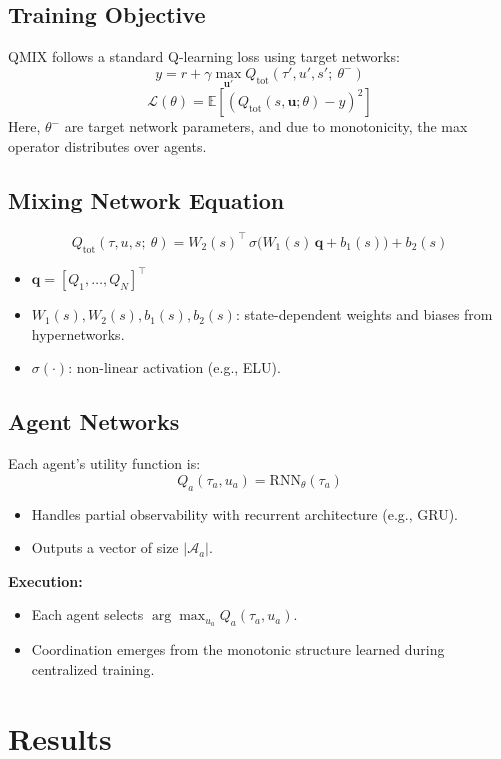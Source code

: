 \documentclass[../Main.tex]{subfiles}
\begin{document}
\subsection{Training Objective}

QMIX follows a standard Q-learning loss using target networks:
\[
y = r + \gamma \max_{\mathbf{u}'} Q_{\text{tot}}(\tau', u', s';\ \theta^-)
\]
\[
\mathcal{L}(\theta) = \mathbb{E} \left[ \left( Q_{\text{tot}}(s, \mathbf{u}; \theta) - y \right)^2 \right]
\]
Here, \( \theta^- \) are target network parameters, and due to monotonicity, the max operator distributes over agents.

\subsection{Mixing Network Equation}
\[
Q_{\text{tot}}(\tau, u, s;\ \theta) = W_2(s)^\top \,\sigma\!\Big(W_1(s)\,\mathbf{q} + b_1(s)\Big) + b_2(s)
\]
\begin{itemize}
    \item \( \mathbf{q} = [Q_1, \dots, Q_N]^\top \)
    \item \( W_1(s), W_2(s), b_1(s), b_2(s) \): state-dependent weights and biases from hypernetworks.
    \item \( \sigma(\cdot) \): non-linear activation (e.g., ELU).
\end{itemize}

\subsection{Agent Networks}

Each agent’s utility function is:
\[
Q_a(\tau_a, u_a) = \text{RNN}_\theta(\tau_a)
\]
\begin{itemize}
    \item Handles partial observability with recurrent architecture (e.g., GRU).
    \item Outputs a vector of size \( |\mathcal{A}_a| \).
\end{itemize}

\textbf{Execution:}
\begin{itemize}
    \item Each agent selects \( \arg\max_{u_a} Q_a(\tau_a, u_a) \).
    \item Coordination emerges from the monotonic structure learned during centralized training.
\end{itemize}

\section{Results}
\end{document}
